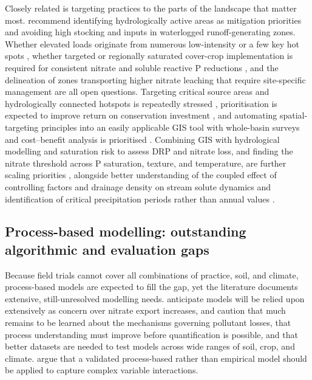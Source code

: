 \documentclass[11pt]{article}
\begin{document}
Closely related is targeting practices to the parts of the landscape that matter most. \textcite{Melland2008} recommend identifying hydrologically active areas as mitigation priorities and avoiding high stocking and inputs in waterlogged runoff-generating zones. Whether elevated loads originate from numerous low-intensity or a few key hot spots \parencite{Irvine2019}, whether targeted or regionally saturated cover-crop implementation is required for consistent nitrate and soluble reactive P reductions \parencite{Speir2022}, and the delineation of zones transporting higher nitrate leaching that require site-specific management \parencite{Bakhsh2005b} are all open questions. Targeting critical source areas and hydrologically connected hotspots is repeatedly stressed \parencite{Baulch2019,McDowell2015,Brendel2019}, prioritisation is expected to improve return on conservation investment \parencite{Makhtoumi2025}, and automating spatial-targeting principles into an easily applicable GIS tool with whole-basin surveys and cost--benefit analysis is prioritised \parencite{Kvítek2023}. Combining GIS with hydrological modelling and saturation risk to assess DRP and nitrate loss, and finding the nitrate threshold across P saturation, texture, and temperature, are further scaling priorities \parencite{Smith2023}, alongside better understanding of the coupled effect of controlling factors and drainage density on stream solute dynamics \parencite{Kennedy2012} and identification of critical precipitation periods rather than annual values \parencite{Salo2006}.

\subsection{Process-based modelling: outstanding algorithmic and evaluation gaps}

Because field trials cannot cover all combinations of practice, soil, and climate, process-based models are expected to fill the gap, yet the literature documents extensive, still-unresolved modelling needs. \textcite{Du2017} anticipate models will be relied upon extensively as concern over nitrate export increases, and \textcite{SKAGGS1994} caution that much remains to be learned about the mechanisms governing pollutant losses, that process understanding must improve before quantification is possible, and that better datasets are needed to test models across wide ranges of soil, crop, and climate. \textcite{Smith2008} argue that a validated process-based rather than empirical model should be applied to capture complex variable interactions.
\end{document}
